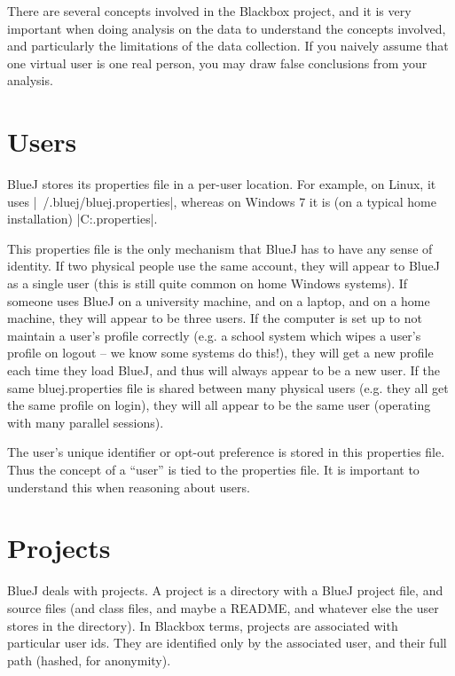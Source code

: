 \documentclass{report}
\begin{document}
There are several concepts involved in the Blackbox project, and it is
very important when doing analysis on the data to understand the concepts
involved, and particularly the limitations of the data collection.  If you
naively assume that one virtual user is one real person, you may draw false
conclusions from your analysis.

\section{Users}
\label{def:users}

BlueJ stores its properties file in a per-user location.  For example, on
Linux, it uses |~/.bluej/bluej.properties|, whereas on Windows 7 it is (on a typical
home installation) |C:\Users\Joe\bluej\bluej.properties|.

This properties file is the only mechanism that BlueJ has to have any sense of
identity.  If two physical people use the same account, they will appear to
BlueJ as a single user (this is still quite common on home Windows systems).
If someone uses BlueJ on a university machine, and on a laptop, and on a home
machine, they will appear to be three users.
If the computer is set up to not maintain a user's profile correctly (e.g. a
school system which wipes a user's profile on logout -- we know some systems
do this!), they will get a new profile each time they load BlueJ, and thus
will always appear to be a new user.  If the same bluej.properties file is
shared between many physical users (e.g. they all get the same profile on
login), they will all appear to be the same user (operating with many parallel sessions).

The user's unique identifier or opt-out preference is stored in this
properties file.  Thus the concept of a ``user'' is tied to the properties
file.  It is important to understand this when reasoning about users.

\section{Projects}
\label{def:projects}

BlueJ deals with projects.  A project is a directory with a BlueJ project
file, and source files (and class files, and maybe a README, and whatever else
the user stores in the directory).  In Blackbox terms, projects are associated
with particular user ids.  They are identified only by the associated user,
and their full path (hashed, for anonymity).
\end{document}
